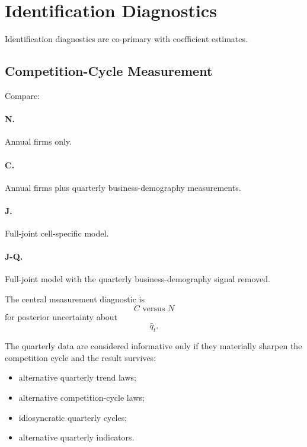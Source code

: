 \documentclass[11pt]{article}
\begin{document}
\section{Identification Diagnostics}

Identification diagnostics are co-primary with coefficient estimates.

\subsection{Competition-Cycle Measurement}

Compare:

\paragraph{N.}
Annual firms only.

\paragraph{C.}
Annual firms plus quarterly business-demography measurements.

\paragraph{J.}
Full-joint cell-specific model.

\paragraph{J-Q.}
Full-joint model with the quarterly business-demography signal removed.

The central measurement diagnostic is
\begin{equation}
C\text{ versus }N
\end{equation}
for posterior uncertainty about
\begin{equation}
\hat q_t.
\end{equation}

The quarterly data are considered informative only if they materially sharpen the competition cycle and the result survives:
\begin{itemize}
\item alternative quarterly trend laws;
\item alternative competition-cycle laws;
\item idiosyncratic quarterly cycles;
\item alternative quarterly indicators.
\end{itemize}
\end{document}
